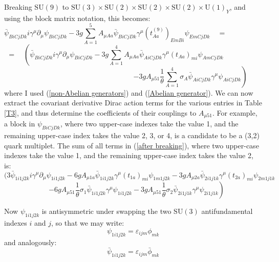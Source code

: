 \documentclass[a4paper,12pt,oneside]{article}
\begin{document}
Breaking $\mathrm{SU}(9)$ to $\mathrm{SU}(3)\times\mathrm{SU}(2)
\times\mathrm{SU}(2)\times\mathrm{SU}(2)\times\mathrm{U}(1)_Y$, and
using the block matrix notation, this becomes:
\begin{displaymath}
\bar{\psi}_{BiCjDk}i\gamma^\mu\partial_\mu\psi_{BiCjDk}
- 3 g \sum_{A=1}^5 A_{\mu Aa}\bar{\psi}_{BiCjDk}\gamma^\mu 
\left(t_{Aa}^{(9)}\right)_{EmBi}\psi_{EmCjDk}\quad =\qquad\qquad
\qquad
\end{displaymath}
\begin{displaymath}
=\quad\left(\bar{\psi}_{BiCjDk}i\gamma^\mu\partial_\mu\psi_{BiCjDk}
- 3 g \sum_{A=1}^4 A_{\mu Aa}\bar{\psi}_{AiCjDk}\gamma^\mu 
\left(t_{Aa}\right)_{mi}\psi_{AmCjDk}\right.\quad\qquad\quad\quad
\end{displaymath}
\begin{equation}\label{after breaking}
\qquad\qquad\qquad\qquad\qquad\qquad\qquad\qquad\quad
\left. - 3 g A_{\mu 51} 
\frac{1}{\theta}
\displaystyle\sum_{A=1}^4\sigma_A
\bar{\psi}_{AiCjDk}\gamma^\mu\psi_{AiCjDk}\right)\quad
\end{equation}
where I used (\ref{non-Abelian generators}) and
(\ref{Abelian generator}).  We can now extract the covariant 
derivative Dirac action terms for the various entries in Table 
\ref{T3}, and thus determine the coefficients of their couplings to
$A_{\mu 51}$.  For example, a block in $\psi_{BiCjDk}$, where two
upper-case indexes take the value 1, and the remaining upper-case
index takes the value 2, 3, or 4, is a candidate to be a (3,2) quark
multiplet.  The sum of all terms in (\ref{after breaking}), where
two upper-case indexes take the value 1, and the remaining 
upper-case index takes the value 2, is:
\begin{displaymath}
\bigg(3\bar{\psi}_{1i1j2k}i\gamma^\mu\partial_\mu\psi_{1i1j2k}
- 6 g A_{\mu 1a}\bar{\psi}_{1i1j2k}\gamma^\mu\! 
\left(t_{1a}\right)_{mi}\psi_{1m1j2k}- 3 g A_{\mu 2a}\bar{\psi}_{2i1j1k}\gamma^\mu\! 
\left(t_{2a}\right)_{mi}\psi_{2m1j1k}
\end{displaymath}
\begin{equation}\label{112 after breaking}
\qquad\left.- 6 g A_{\mu 51} \frac{1}{\theta}\sigma_1
\bar{\psi}_{1i1j2k}\gamma^\mu\psi_{1i1j2k}
- 3 g A_{\mu 51} \frac{1}{\theta}\sigma_2
\bar{\psi}_{2i1j1k}\gamma^\mu\psi_{2i1j1k}\right)\quad
\end{equation}

Now $\psi_{1i1j2k}$ is antisymmetric under swapping the two
$\mathrm{SU}(3)$ antifundamental indexes $i$ and $j$, so that we may
write:
\begin{equation}\label{112 as quarks}
\psi_{1i1j2k}=\varepsilon_{ijm}\phi_{mk}
\end{equation}
and analogously:
\begin{equation}\label{RH 112 as antiquarks}
\bar{\psi}_{1i1j2k}=\varepsilon_{ijm}\bar{\phi}_{mk}
\end{equation}
\end{document}
